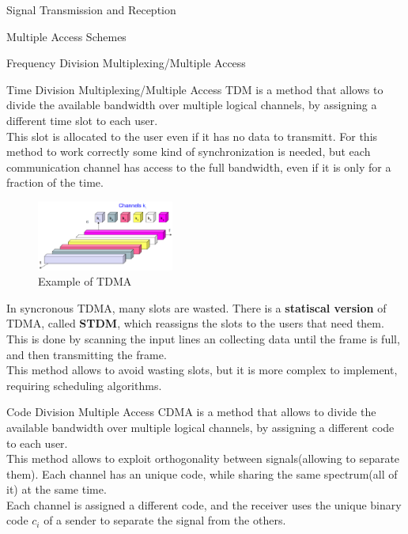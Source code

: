 \begin{section}{Signal Transmission and Reception}
\begin{subsection}{Multiple Access Schemes}
\begin{subsubsection}{Frequency Division Multiplexing/Multiple Access}
    \end{subsubsection}
    \begin{subsubsection}{Time Division Multiplexing/Multiple Access}
      TDM is a method that allows to divide the available bandwidth over multiple logical channels,
      by assigning a different time slot to each user.\\
      This slot is allocated to the user even if it has no data to transmitt. For this method to 
      work correctly some kind of synchronization is needed, but each communication channel has
      access to the full bandwidth, even if it is only for a fraction of the time.\\
      \begin{figure}[h]
        \centering
        \includegraphics[width=0.4\textwidth]{img/wireless/TDMA.png}
        \caption{Example of TDMA}
        \label{fig:TDMA}
      \end{figure}
    In syncronous TDMA, many slots are wasted. There is a \textbf{statiscal version} of TDMA, called
    \textbf{STDM}, which reassigns the slots to the users that need them.\\
    This is done by scanning the input lines an collecting data until the frame is full, and then
    transmitting the frame.\\
    This method allows to avoid wasting slots, but it is more complex to implement, requiring 
    scheduling algorithms.\\
    \end{subsubsection}
    \begin{subsubsection}{Code Division Multiple Access}
      CDMA is a method that allows to divide the available bandwidth over multiple logical channels,
      by assigning a different code to each user.\\
      This method allows to exploit orthogonality between signals(allowing to separate them). Each
      channel has an unique code, while sharing the same spectrum(all of it) at the same time.\\
      Each channel is assigned a different code, and the receiver uses the unique binary code $c_i$
      of a sender to separate the signal from the others.\\


\end{subsubsection}
\end{subsection}
\end{section}
